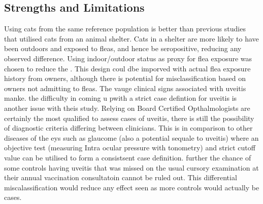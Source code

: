 \documentclass[11pt,twocolumn]{article}
\begin{document}
	\subsection{Strengths and Limitations}
		Using cats from the same reference population is better than previous studies that utilised cats from an animal shelter. Cats in a shelter are more likely to have been outdoors and exposed to fleas, and hence be seropositive, reducing any observed difference.
		Using indoor/outdoor status as proxy for flea exposure was chosen to reduce the . 
		This design coul dbe imporved with actual flea exposure history from owners, although there is potential for misclassification based on owners not admitting to fleas.
		The vauge clinical signs associated with uveitis manke.
		the difficulty in coming u pwith a strict case defintion for uveitis is another issue with theis study. Relying on Board Certified Opthalmologists are certainly the most qualified to assess cases of uveitis, there is still the possibility of diagnostic criteria differing between clinicians. This is in comparison to other diseases of the eys such as glaucome (also a potential sequale to uveitis) where an objective test (measuring Intra ocular pressure with tonometry) and strict cutoff value can be utilised to form a consistsent case definition.
		further the chance of some controls having uveitis that was missed on the usual cursory examination at their annual vaccination consultatoin cannot be ruled out. This differential miscalassification would reduce any effect seen as more controls would actually be cases.

\newpage


\end{document}

